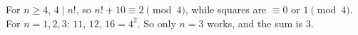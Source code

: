 For $n\ge4$, $4\mid n!$, so $n!+10\equiv2\pmod4$, while squares are $\equiv0$ or $1\pmod4$. For $n=1,2,3$: $11$, $12$, $16=4^2$. So only $n=3$ works, and the sum is $\boxed{3}$.

